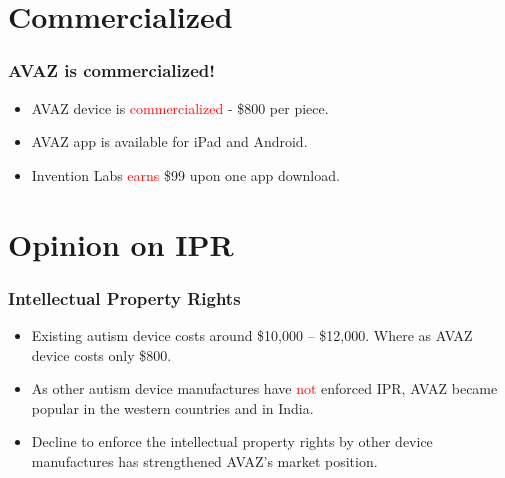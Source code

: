 \documentclass[12pt]{beamer}
\begin{document}
\section{Commercialized}
\begin{frame}
	\frametitle {AVAZ is commercialized!}
	\begin{itemize}
		\item AVAZ device is \textcolor{red}{commercialized} - \$800 per piece.
		\item AVAZ app is available for iPad and Android.
		\item Invention Labs \textcolor{red}{earns} \$99 upon one app download.
	\end{itemize}
\end{frame}

\section{Opinion on IPR}
\begin{frame}
	\frametitle {Intellectual Property Rights}
	\begin{itemize}
		\item Existing autism device costs around \$10,000 -- \$12,000. Where as AVAZ device costs only \$800. 
		\item As other autism device manufactures have \textcolor{red}{not} enforced IPR, AVAZ became popular in the western countries and in India. 
		\item Decline to enforce the intellectual property rights by other device manufactures has strengthened AVAZ's market position.
	\end{itemize}
\end{frame}

\end{document}
